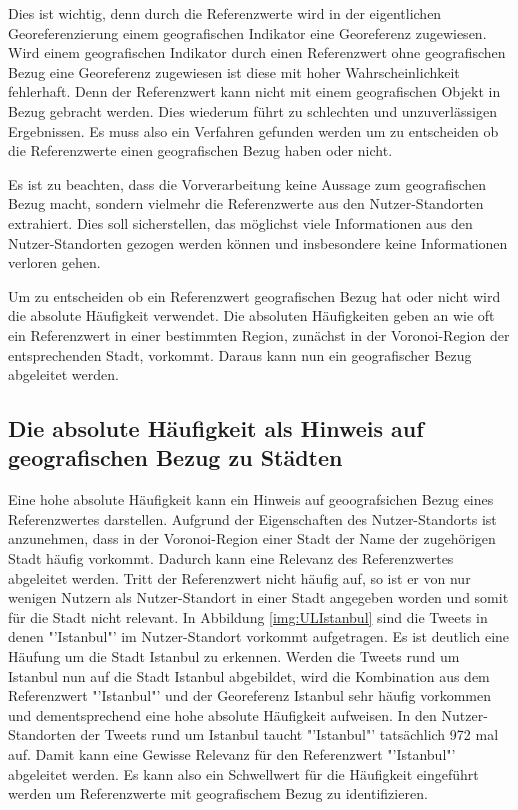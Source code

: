 		Dies ist wichtig, denn durch die Referenzwerte wird in der eigentlichen Georeferenzierung einem geografischen Indikator eine Georeferenz zugewiesen. 
		Wird einem geografischen Indikator durch einen Referenzwert ohne geografischen Bezug eine Georeferenz zugewiesen ist diese mit hoher Wahrscheinlichkeit fehlerhaft.
		Denn der Referenzwert kann nicht mit einem geografischen Objekt in Bezug gebracht werden.
		Dies wiederum führt zu schlechten und unzuverlässigen Ergebnissen.
		Es muss also ein Verfahren gefunden werden um zu entscheiden ob die Referenzwerte einen geografischen Bezug haben oder nicht.

		Es ist zu beachten, dass die Vorverarbeitung keine Aussage zum geografischen Bezug macht, sondern vielmehr die Referenzwerte aus den Nutzer-Standorten extrahiert. 
		Dies soll sicherstellen, das möglichst viele Informationen aus den Nutzer-Standorten gezogen werden können und insbesondere keine Informationen verloren gehen.  
		
		Um zu entscheiden ob ein Referenzwert geografischen Bezug hat oder nicht wird die absolute Häufigkeit verwendet.
		Die absoluten Häufigkeiten geben an wie oft ein Referenzwert in einer bestimmten Region, zunächst in der Voronoi-Region der entsprechenden Stadt, vorkommt.			 
		Daraus kann nun ein geografischer Bezug abgeleitet werden.

		\subsection{Die absolute Häufigkeit als Hinweis auf geografischen Bezug zu Städten} 
			
			Eine hohe absolute Häufigkeit kann ein Hinweis auf geoografsichen Bezug eines Referenzwertes darstellen. 
			Aufgrund der Eigenschaften des Nutzer-Standorts ist anzunehmen, dass in der Voronoi-Region einer Stadt der Name der zugehörigen Stadt häufig vorkommt.
			Dadurch kann eine Relevanz des Referenzwertes abgeleitet werden. 
			Tritt der Referenzwert nicht häufig auf, so ist er von nur wenigen Nutzern als Nutzer-Standort in einer Stadt angegeben worden und somit für die Stadt nicht relevant.
			In Abbildung \ref{img:ULIstanbul} sind die Tweets in denen "'Istanbul"' im Nutzer-Standort vorkommt aufgetragen.
			Es ist deutlich eine Häufung um die Stadt Istanbul zu erkennen. 
			Werden die Tweets rund um Istanbul nun auf die Stadt Istanbul abgebildet, wird die Kombination aus dem Referenzwert "'Istanbul"' und der Georeferenz Istanbul sehr häufig vorkommen und dementsprechend eine hohe absolute Häufigkeit aufweisen.
			In den Nutzer-Standorten der Tweets rund um Istanbul taucht "'Istanbul"' tatsächlich 972 mal auf.
			Damit kann eine Gewisse Relevanz für den Referenzwert "'Istanbul"' abgeleitet werden.
			Es kann also ein Schwellwert für die Häufigkeit eingeführt werden um Referenzwerte mit geografischem Bezug zu identifizieren.

